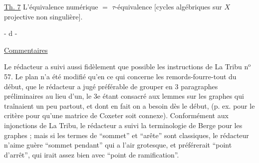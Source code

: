 





\uline{Th. 7} L'équivalence numérique $=$ $\tau$-équivalence [cycles algébriques sur $X$ projective non singulière].



- d -

\uline{Commentaires}

Le rédacteur a suivi aussi fidèlement que possible les instructions de La Tribu n$^{\mathrm{o}}$ 57. Le plan n'a été modifié qu'en ce qui concerne les remords-fourre-tout du début, que le rédacteur a jugé préférable de grouper en 3 paragraphes préliminaires au lieu d'un, le 3e étant consacré aux lemmes sur les graphes qui traînaient un peu partout, et dont en fait on a besoin dès le début, (p. ex. pour le critère pour qu'une matrice de Coxeter soit connexe). Conformément aux injonctions de La Tribu, le rédacteur a suivi la terminologie de Berge pour les graphes ; mais si les termes de ``sommet'' et ``arête'' sont classiques, le rédacteur n'aime guère ``sommet pendant'' qui a l'air grotesque, et préférerait ``point d'arrêt'', qui irait assez bien avec ``point de ramification''.

